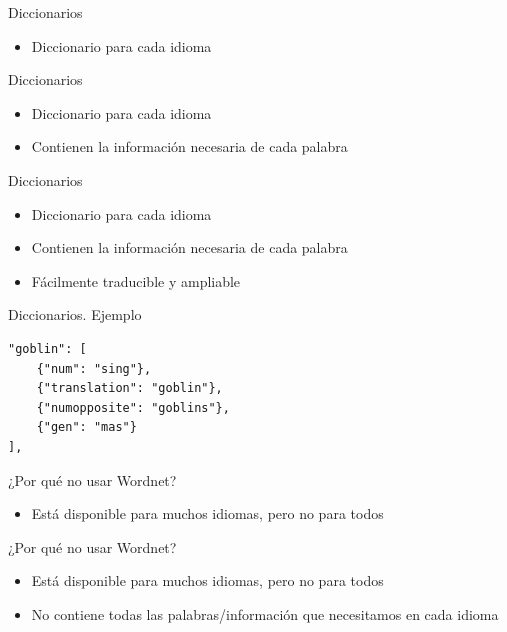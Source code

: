 \begin{tframe}{Diccionarios}
	\begin{itemize}
		\item<+-| alert@+> Diccionario para cada idioma
	\end{itemize}
\end{tframe}

\begin{tframe}{Diccionarios}
	\begin{itemize}
		\item Diccionario para cada idioma
		\item<+-| alert@+> Contienen la información necesaria de cada palabra
	\end{itemize}
\end{tframe}

\begin{tframe}{Diccionarios}
	\begin{itemize}
		\item Diccionario para cada idioma
		\item Contienen la información necesaria de cada palabra
		\item<+-| alert@+> Fácilmente traducible y ampliable
	\end{itemize}
\end{tframe}

\begin{frame}[t, fragile]{Diccionarios. Ejemplo}
	\begin{Verbatim}
"goblin": [
    {"num": "sing"},
    {"translation": "goblin"},
    {"numopposite": "goblins"},
    {"gen": "mas"}
],
	\end{Verbatim}
\end{frame}

\begin{tframe}{¿Por qué no usar Wordnet?}
	\begin{itemize}
		\item<+-| alert@+> Está disponible para muchos idiomas, pero no para todos
	\end{itemize}
\end{tframe}

\begin{tframe}{¿Por qué no usar Wordnet?}
	\begin{itemize}
		\item Está disponible para muchos idiomas, pero no para todos
		\item<+-| alert@+> No contiene todas las palabras/información que necesitamos en cada idioma
	\end{itemize}
\end{tframe}


